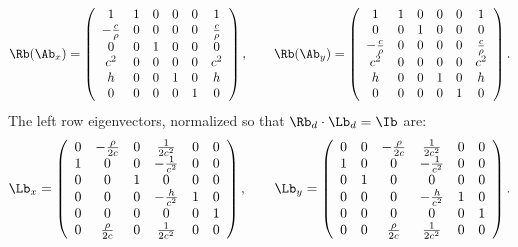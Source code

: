 \begin{equation}
\Rb(\Ab_x) =
\left(\begin{array}{cccccc}
1 & 1 & 0 & 0 & 0 & 1 \\
-\frac{c}{\rho} & 0 & 0 & 0 & 0 & \frac{c}{\rho} \\
0 & 0 & 1 & 0 & 0 & 0 \\
c^2 & 0 & 0 & 0 & 0 & c^2 \\
h & 0 & 0 & 1 & 0 & h \\
0 & 0 & 0 & 0 & 1 & 0 \\
\end{array}\right),
\qquad
\Rb(\Ab_y) =
\left(\begin{array}{cccccc}
1 & 1 & 0 & 0 & 0 & 1 \\
0 & 0 & 1 & 0 & 0 & 0 \\
-\frac{c}{\rho} & 0 & 0 & 0 & 0 & \frac{c}{\rho} \\
c^2 & 0 & 0 & 0 & 0 & c^2 \\
h & 0 & 0 & 1 & 0 & h \\
0 & 0 & 0 & 0 & 1 & 0 \\
\end{array}\right).
\end{equation}
The left row eigenvectors, normalized so that $\Rb_d\cdot\Lb_d = \Ib$ are:
\begin{equation}
\Lb_x =
\left(\begin{array}{cccccc}
0 & -\frac{\rho}{2c} & 0 & \frac{1}{2c^2} & 0 & 0 \\
1 & 0 & 0 & -\frac{1}{c^2} & 0 & 0 \\
0 & 0 & 1 & 0 & 0 & 0 \\
0 & 0 & 0 & -\frac{h}{c^2} & 1 & 0 \\
0 & 0 & 0 & 0 & 0 & 1 \\
0 & \frac{\rho}{2c} & 0 & \frac{1}{2c^2} & 0 & 0
\end{array}\right),
\qquad
\Lb_y =
\left(\begin{array}{cccccc}
0 & 0 & -\frac{\rho}{2c} & \frac{1}{2c^2} & 0 & 0 \\
1 & 0 & 0 & -\frac{1}{c^2} & 0 & 0 \\
0 & 1 & 0 & 0 & 0 & 0 \\
0 & 0 & 0 & -\frac{h}{c^2} & 1 & 0 \\
0 & 0 & 0 & 0 & 0 & 1 \\
0 & 0 & \frac{\rho}{2c} & \frac{1}{2c^2} & 0 & 0
\end{array}\right).
\end{equation}
